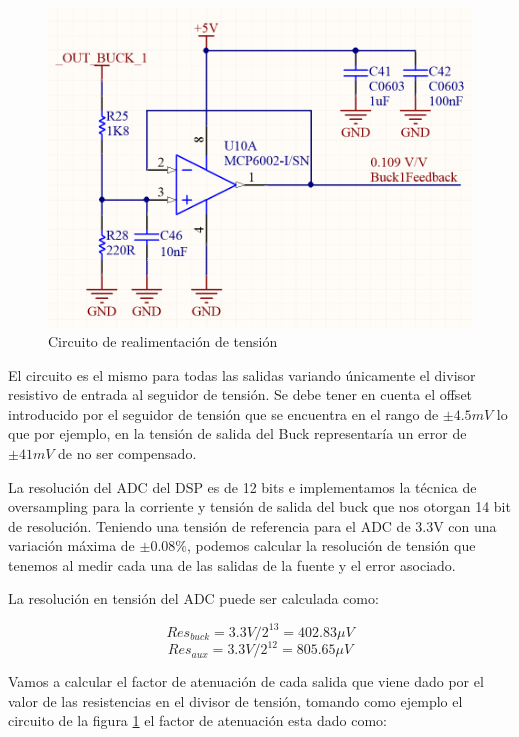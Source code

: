 \documentclass[12pt]{report}
\begin{document}
\begin{figure}[H]
	\centering
	\includegraphics[width=\textwidth,height=\textheight,keepaspectratio]{voltage_feedback}
	\caption{Circuito de realimentación de tensión}
	\label{voltage_feedback_circuit}
\end{figure}

El circuito es el mismo para todas las salidas variando únicamente el divisor resistivo de entrada al seguidor de tensión. Se debe tener en cuenta el offset introducido por el seguidor de tensión que se encuentra en el rango de $\pm 4.5mV$ lo que por ejemplo, en la tensión de salida del Buck representaría un error de $\pm 41mV$ de no ser compensado.

La resolución del ADC del DSP es de 12 bits e implementamos la técnica de oversampling para la corriente y tensión de salida del buck que nos otorgan 14 bit de resolución. Teniendo una tensión de referencia para el ADC de 3.3V con una variación máxima de $\pm0.08\%$, podemos calcular la resolución de tensión que tenemos al medir cada una de las salidas de la fuente y el error asociado.

La resolución en tensión del ADC puede ser calculada como:

\begin{equation}
	Res_{buck} = 3.3V / 2^{13} = 402.83 \mu V
\end{equation}
\begin{equation}
	Res_{aux} = 3.3V / 2^{12} = 805.65 \mu V
\end{equation}

Vamos a calcular el factor de atenuación de cada salida que viene dado por el valor de las resistencias en el divisor de tensión, tomando como ejemplo el circuito de la figura \ref{voltage_feedback_circuit} el factor de atenuación esta dado como:
\end{document}
